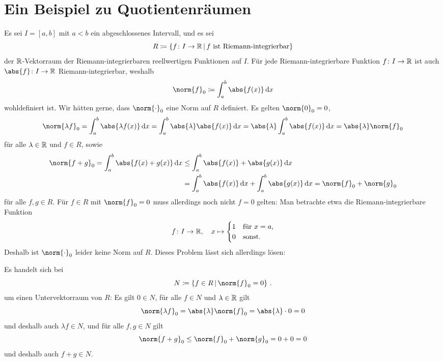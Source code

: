 \section*{Ein Beispiel zu Quotientenräumen}

Es sei $I = [a,b]$ mit $a < b$ ein abgeschlossenes Intervall, und es sei
\[
            R
  \defined  \{
              f \colon I \to \Real
            \suchthat
              \text{$f$ ist Riemann-integrierbar}
            \}
\]
der $\mathbb{R}$-Vektorraum der Riemann-integrierbaren reellwertigen Funktionen auf $I$.
Für jede Riemann-integrierbare Funktion $f \colon I \to \mathbb{R}$ ist auch $\abs{f} \colon I \to \Real$ Riemann-integrierbar, weshalb
\[
            \norm{f}_0
  \defined  \int_a^b \abs{f(x)} \,\text{d}x
\]
wohldefiniert ist.
Wir hätten gerne, dass $\norm{\cdot}_0$ eine Norm auf $R$ definiert.
Es gelten $\norm{0}_0 = 0$, 
\[
    \norm{\lambda f}_0
  = \int_a^b \abs{\lambda f(x)}  \,\text{d}x
  = \int_a^b \abs{\lambda} \abs{f(x)} \,\text{d}x
  = \abs{\lambda} \int_a^b \abs{f(x)} \,\text{d}x
  = \abs{\lambda} \norm{f}_0
\]
für alle $\lambda \in \mathbb{R}$ und $f \in R$, sowie
\begin{align*}
        \norm{f + g}_0
  =     \int_a^b \abs{f(x) + g(x)} \,\text{d}x
  &\leq \int_a^b \abs{f(x)} + \abs{g(x)} \,\text{d}x  \\
  &=    \int_a^b \abs{f(x)} \,\text{d}x + \int_a^b \abs{g(x)} \,\text{d}x
  =     \norm{f}_0 + \norm{g}_0
\end{align*}
für alle $f, g \in R$.
Für $f \in R$ mit $\norm{f}_0 = 0$ muss allerdings noch nicht $f = 0$ gelten:
Man betrachte etwa die Riemann-integrierbare Funktion
\[
          f
  \colon  I
  \to     \mathbb{R},
  \quad   x
  \mapsto \begin{cases}
            1 & \text{für $x = a$}, \\
            0 & \text{sonst}.
          \end{cases}
\]
Deshalb ist $\norm{\cdot}_0$ leider keine Norm auf $R$.
Dieses Problem lässt sich allerdings lösen:

Es handelt sich bei
\[
            N
  \defined  \left\{
              f \in R
            \suchthat
              \norm{f}_0 = 0
            \right\} \,.
\]
um einen Untervektorraum von $R$:
Es gilt $0 \in N$, für alle $f \in N$ und $\lambda \in \mathbb{R}$ gilt
\[
    \norm{\lambda f}_0
  = \abs{\lambda} \norm{f}_0
  = \abs{\lambda} \cdot 0
  = 0
\]
und deshalb auch $\lambda f \in N$, und für alle $f, g \in N$ gilt
\[
        \norm{f + g}_0
  \leq  \norm{f}_0 + \norm{g}_0
  =     0 + 0
  =     0
\]
und deshalb auch $f + g \in N$.

